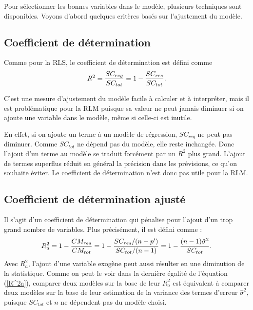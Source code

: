 Pour sélectionner les bonnes variables dans le modèle, plusieurs techniques sont disponibles. Voyons d'abord quelques critères basés sur l'ajustement du modèle.

\subsection{Coefficient de détermination}

Comme pour la RLS, le coefficient de détermination est défini comme
\begin{equation}\label{R^2}
R^2={SC_{reg}\over SC_{tot}}=1-{SC_{res}\over SC_{tot}}.
\end{equation}

C'est une mesure d'ajustement du modèle facile à calculer et à interpréter, mais il est problématique pour la RLM puisque sa valeur ne peut jamais diminuer si on ajoute une variable dans le modèle, même si celle-ci est inutile.

En effet, si on ajoute un terme à un modèle de régression, $SC_{reg}$ ne peut pas diminuer. Comme $SC_{tot}$ ne dépend pas du modèle, elle reste inchangée. Donc l'ajout d'un terme au modèle se traduit forcément par un $R^2$ plus grand.
L'ajout de termes superflus réduit en général la précision dans les prévisions, ce qu'on souhaite éviter. Le coefficient de détermination n'est donc pas utile pour la RLM.

\subsection{Coefficient de détermination ajusté}

Il s'agit d'un coefficient de détermination qui pénalise pour l'ajout d'un trop grand nombre de variables. Plus précisément, il est défini comme :
\begin{equation}\label{R^2a}
R^2_{a}=1-{CM_{res}\over CM_{tot}}=1-{SC_{res}/(n-p')\over
SC_{tot}/(n-1)}=1-{(n-1)\hat\sigma^2\over SC_{tot}}.
\end{equation}
Avec $R^2_{a}$, l'ajout d'une variable exogène peut aussi
résulter en une diminution de la statistique.
Comme on peut le voir dans la dernière
égalité de l'équation (\ref{R^2a}), comparer deux
modèles sur la base de leur $R^2_{a}$ est équivalent à
comparer deux modèles sur la base de leur estimation de la
variance des termes d'erreur $\hat\sigma^2$, puisque $SC_{tot}$ et $n$ ne
dépendent pas du modèle choisi.


